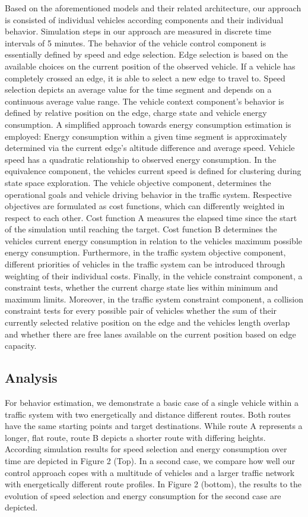 \documentclass[conference]{../cls/IEEEtran}
\begin{document}
Based on the aforementioned models and their related architecture, our approach
is consisted of individual vehicles according components and their individual
behavior. Simulation steps in our approach are measured in discrete time
intervals of 5 minutes. The behavior of the vehicle control component is
essentially defined by speed and edge selection. Edge selection is based on the available
choices on the current position of the observed vehicle. If a vehicle has
completely crossed an edge, it is able to select a new edge to travel to. Speed
selection depicts an average value for the time segment and depends on a
continuous average value range. The vehicle context component's behavior is defined by
relative position on the edge, charge state and vehicle energy consumption. A simplified approach towards energy
consumption estimation is employed: Energy consumption within a given time
segment is approximately determined via the current edge's altitude difference 
and average speed. Vehicle speed has a quadratic relationship to observed
energy consumption. In the equivalence component, the vehicles current speed is defined
for clustering during state space exploration. The vehicle objective component,
determines the operational goals and vehicle driving behavior in the traffic
system. Respective objectives are formulated as cost functions, which can
differently weighted in respect to each other. Cost function A measures the
elapsed time since the start of the simulation until reaching the target. Cost function B determines the vehicles current
energy consumption in relation to the vehicles maximum possible energy consumption.
Furthermore, in the traffic system objective component, different priorities of
vehicles in the traffic system can be introduced through weighting of their individual costs.
Finally, in the vehicle constraint component, a constraint tests, whether the
current charge state lies within minimum and maximum limits. Moreover, in the traffic
system constraint component, a collision constraint tests for every possible
pair of vehicles whether the sum of their currently selected relative position
on the edge and the vehicles length overlap and whether there are free lanes
available on the current position based on edge capacity.

\subsection{Analysis}

For behavior estimation, we demonstrate a basic case of a
single vehicle within a traffic system with two energetically and
distance different routes. Both routes have the same starting points and target
destinations. While route A represents a longer, flat route, route B depicts a
shorter route with differing heights. According simulation results for speed selection and energy consumption over time are depicted in Figure 2 (Top). In a second case, we
compare how well our control approach copes with a multitude of vehicles and a larger traffic network with energetically different route profiles. In Figure 2 (bottom), the 
results to the evolution of speed selection and energy consumption for the
second case are depicted.
\end{document}
